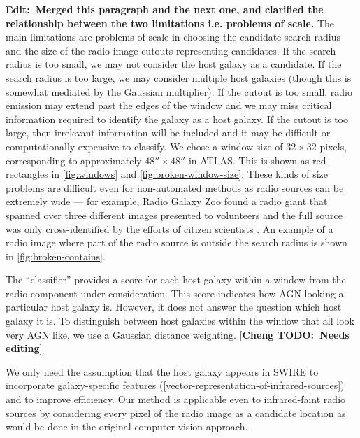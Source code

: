 \documentclass[fleqn,usenatbib,usedcolumn]{mnras}
\newcommand{\cheng}[1]{ {\color{teal}[{\bf Cheng TODO:~{#1}}]} }
\newcommand{\matthew}[2]{ {\color{white!20!violet}[{\bf TODO(#1):~{#2}}]} }
\newcommand{\edit}[1]{{\bf Edit:~{#1}}}
\begin{document}
    \edit{Merged this paragraph and the next one, and clarified the relationship between the two limitations i.e. problems of scale.} The main limitations are problems of scale in choosing the candidate search radius and the size of the radio image cutouts representing candidates. If the search radius is too small, we may not consider the host galaxy as a candidate. If the search radius is too large, we may consider multiple host galaxies (though this is somewhat mediated by the Gaussian multiplier). If the cutout is too small, radio emission may extend past the edges of the window and we may miss critical information required to identify the galaxy as a host galaxy. If the cutout is too large, then irrelevant information will be included and it may be difficult or computationally expensive to classify. We chose a window size of $32 \times 32$ pixels, corresponding to approximately $48'' \times 48''$ in ATLAS. This is shown as red rectangles in \autoref{fig:windows} and \autoref{fig:broken-window-size}. These kinds of size problems are difficult even for non-automated methods as radio sources can be extremely wide --- for example, Radio Galaxy Zoo found a radio giant that spanned over three different images presented to volunteers and the full source was only cross-identified by the efforts of citizen scientists \citep{banfield15}. An example of a radio image where part of the radio source is outside the search radius is shown in \autoref{fig:broken-contains}.

    The ``classifier'' provides a score for each host galaxy within a window from the radio
    component under consideration. This score indicates how AGN looking a particular host
    galaxy is. However, it does not answer the question which host galaxy it is. To distinguish
    between host galaxies within the window that all look very AGN like, we use a Gaussian distance
    weighting. \cheng{Needs editing}


    We only need the assumption that the host galaxy appears in SWIRE to
    incorporate galaxy-specific features
    (\autoref{vector-representation-of-infrared-sources}) and to improve
    efficiency. Our method is applicable even to infrared-faint radio sources
    by considering every pixel of the radio image as a candidate location as would be done in the original computer vision approach.
\end{document}
